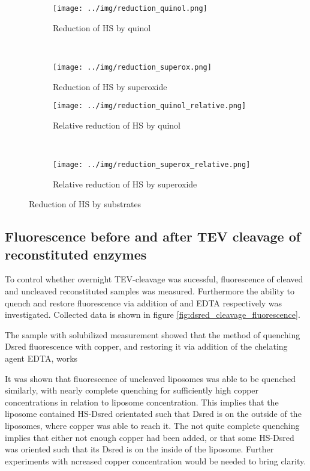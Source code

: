 \begin{figure*}
    \centering
    \begin{subfigure}{0.45\textwidth}
	\centering
	\texttt{[image: ../img/reduction\_quinol.png]}
	\caption{Reduction of HS by quinol}
	\label{fig:reduction_quinol}
    \end{subfigure}
    ~
    \begin{subfigure}{0.45\textwidth}
	\centering
	\texttt{[image: ../img/reduction\_superox.png]}
	\caption{Reduction of HS by superoxide}
	\label{fig:reduction_superox}
    \end{subfigure}

    \begin{subfigure}{0.45\textwidth}
	\centering
	\texttt{[image: ../img/reduction\_quinol\_relative.png]}
	\caption{Relative reduction of HS by quinol}
	\label{fig:reduction_quinol_relative}
    \end{subfigure}
    ~
    \begin{subfigure}{0.45\textwidth}
	\centering
	\texttt{[image: ../img/reduction\_superox\_relative.png]}
	\caption{Relative reduction of HS by superoxide}
	\label{fig:reduction_superox_relative}
    \end{subfigure}
    \caption{Reduction of HS by substrates}
    \label{fig:hs_reduction}
\end{figure*}


\subsection{Fluorescence before and after TEV cleavage of reconstituted enzymes}

To control whether overnight TEV-cleavage was sucessful, fluorescence of cleaved
and uncleaved reconstituted samples was measured. Furthermore the ability to
quench and restore fluorescence via addition of  and EDTA
respectively was investigated. Collected data is shown in figure
\ref{fig:dsred_cleavage_fluorescence}.

The sample with solubilized measurement showed that the method of quenching
Dsred fluorescence with copper, and restoring it via addition of the chelating
agent EDTA, works

It was shown that fluorescence of uncleaved liposomes was able to be quenched
similarly, with nearly complete quenching for sufficiently high copper
concentrations in relation to liposome concentration. This implies that the
liposome contained HS-Dsred orientated such that Dsred is on the outside of the
liposomes, where copper was able to reach it. The not quite complete quenching
implies that either not enough copper had been added, or that some HS-Dsred was
oriented such that its Dsred is on the inside of the liposome. Further
experiments with ncreased copper concentration would be needed to bring
clarity.

